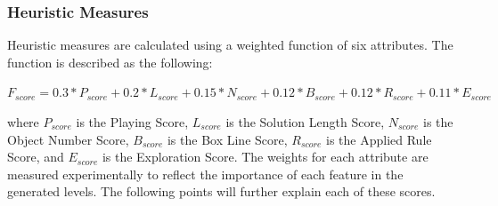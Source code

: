 \subsubsection{Heuristic Measures}
Heuristic measures are calculated using a weighted function of six attributes. The function is described as the following:
\begin{center}$F_{score} = 0.3 * P_{score} + 0.2 * L_{score} + 0.15 * N_{score} + 0.12 * B_{score} + 0.12 * R_{score} + 0.11 * E_{score}$\end{center}
where $P_{score}$ is the Playing Score, $L_{score}$ is the Solution Length Score, $N_{score}$ is the Object Number Score, $B_{score}$ is the Box Line Score, $R_{score}$ is the Applied Rule Score, and $E_{score}$ is the Exploration Score. The weights for each attribute are measured experimentally to reflect the importance of each feature in the generated levels. The following points will further explain each of these scores.
